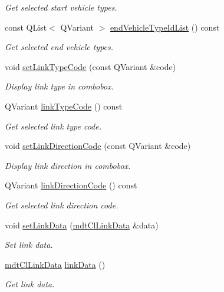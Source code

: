 \begin{DoxyCompactItemize}
\begin{DoxyCompactList}\small\item\em Get selected start vehicle types. \end{DoxyCompactList}\item 
const Q\-List$<$ Q\-Variant $>$ \hyperlink{classmdt_cl_unit_link_dialog_abe96eb187294372b022b2a8ba9c645b6}{end\-Vehicle\-Type\-Id\-List} () const 
\begin{DoxyCompactList}\small\item\em Get selected end vehicle types. \end{DoxyCompactList}\item 
void \hyperlink{classmdt_cl_unit_link_dialog_a34ab2fabffeb5b889be8db9ac08add22}{set\-Link\-Type\-Code} (const Q\-Variant \&code)
\begin{DoxyCompactList}\small\item\em Display link type in combobox. \end{DoxyCompactList}\item 
Q\-Variant \hyperlink{classmdt_cl_unit_link_dialog_aa7d8b93582d68113b6d00922e4979e78}{link\-Type\-Code} () const 
\begin{DoxyCompactList}\small\item\em Get selected link type code. \end{DoxyCompactList}\item 
void \hyperlink{classmdt_cl_unit_link_dialog_a23220c3ea0f051e9155ee9a2a052b5ea}{set\-Link\-Direction\-Code} (const Q\-Variant \&code)
\begin{DoxyCompactList}\small\item\em Display link direction in combobox. \end{DoxyCompactList}\item 
Q\-Variant \hyperlink{classmdt_cl_unit_link_dialog_a4ed022bb559da23be2d192b9e83c40e2}{link\-Direction\-Code} () const 
\begin{DoxyCompactList}\small\item\em Get selected link direction code. \end{DoxyCompactList}\item 
void \hyperlink{classmdt_cl_unit_link_dialog_a43ee4d2a395f42dcaa2667170e5ad0bc}{set\-Link\-Data} (\hyperlink{classmdt_cl_link_data}{mdt\-Cl\-Link\-Data} \&data)
\begin{DoxyCompactList}\small\item\em Set link data. \end{DoxyCompactList}\item 
\hyperlink{classmdt_cl_link_data}{mdt\-Cl\-Link\-Data} \hyperlink{classmdt_cl_unit_link_dialog_a9553b27b636bec6af4139afa11a5a2db}{link\-Data} ()
\begin{DoxyCompactList}\small\item\em Get link data. \end{DoxyCompactList}\end{DoxyCompactItemize}


